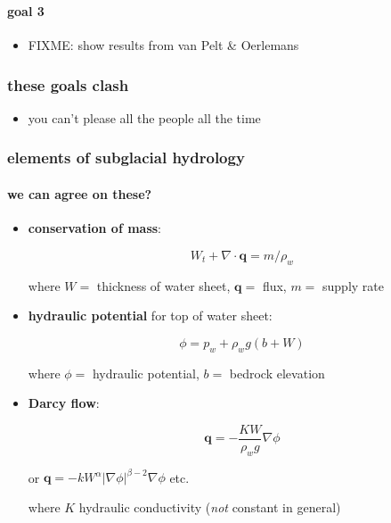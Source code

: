\documentclass[hide notes,intlimits]{beamer}
\begin{document}
\begin{frame}
  \frametitle{\goaltitle}
  \framesubtitle{goal 3}

\begin{center}
\end{center}
  
  \begin{itemize}
    \item FIXME:  show results from van Pelt \& Oerlemans
  \end{itemize}
\end{frame}



\begin{frame}
  \frametitle{these goals clash}

\begin{itemize}
\item you can't please all the people all the time
\end{itemize}
\end{frame}


\begin{frame}
  \frametitle{elements of subglacial hydrology}
  \framesubtitle{we can agree on these?}

\newcommand{\bq}{\mathbf{q}}

  \begin{itemize}
    \item \textbf{conservation of mass}:
    
    $$W_t + \nabla \cdot \bq = m / \rho_w$$

where $W=$ thickness of water sheet, $\bq=$ flux, $m=$ supply rate

    \item \textbf{hydraulic potential} for top of water sheet:
    
    $$\phi = p_w + \rho_w g (b + W)$$

where $\phi=$ hydraulic potential, $b=$ bedrock elevation

    \item \textbf{Darcy flow}:
    
    $$\bq = - \frac{K W}{\rho_w g} \nabla \phi$$
    
    \scriptsize or \quad $\bq = - k W^\alpha |\nabla \phi|^{\beta - 2} \nabla \phi$ \quad etc.
    
\normalsize where $K$ hydraulic conductivity (\emph{not} constant in general)
  \end{itemize}

\end{frame}
\end{document}
